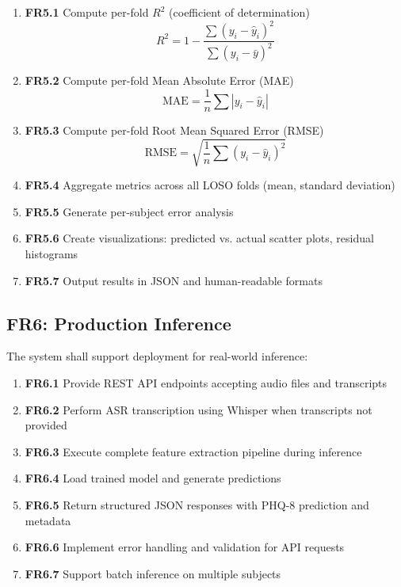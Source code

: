 \documentclass[12pt]{article}
\begin{document}
	\begin{enumerate}
		\item \textbf{FR5.1} Compute per-fold $R^2$ (coefficient of determination)
		\begin{equation}
		R^2 = 1 - \frac{\sum (y_i - \hat{y}_i)^2}{\sum (y_i - \bar{y})^2}
		\end{equation}

		\item \textbf{FR5.2} Compute per-fold Mean Absolute Error (MAE)
		\begin{equation}
		\text{MAE} = \frac{1}{n} \sum |y_i - \hat{y}_i|
		\end{equation}

		\item \textbf{FR5.3} Compute per-fold Root Mean Squared Error (RMSE)
		\begin{equation}
		\text{RMSE} = \sqrt{\frac{1}{n} \sum (y_i - \hat{y}_i)^2}
		\end{equation}

		\item \textbf{FR5.4} Aggregate metrics across all LOSO folds (mean, standard deviation)
		\item \textbf{FR5.5} Generate per-subject error analysis
		\item \textbf{FR5.6} Create visualizations: predicted vs. actual scatter plots, residual histograms
		\item \textbf{FR5.7} Output results in JSON and human-readable formats
	\end{enumerate}

	\subsection{FR6: Production Inference}

	The system shall support deployment for real-world inference:

	\begin{enumerate}
		\item \textbf{FR6.1} Provide REST API endpoints accepting audio files and transcripts
		\item \textbf{FR6.2} Perform ASR transcription using Whisper when transcripts not provided
		\item \textbf{FR6.3} Execute complete feature extraction pipeline during inference
		\item \textbf{FR6.4} Load trained model and generate predictions
		\item \textbf{FR6.5} Return structured JSON responses with PHQ-8 prediction and metadata
		\item \textbf{FR6.6} Implement error handling and validation for API requests
		\item \textbf{FR6.7} Support batch inference on multiple subjects
	\end{enumerate}
\end{document}

